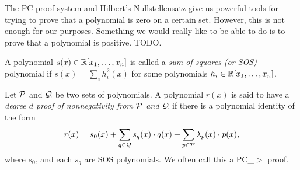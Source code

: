 The PC proof system and Hilbert's Nullstellensatz give us powerful tools for trying to prove that a polynomial is zero on a certain set. However, this is not enough for our purposes. Something we would really like to be able to do is to prove that a polynomial is positive. TODO.
\begin{definition}
A polynomial $s(x) \in \mathbb R[x_1,\dots,x_n]$ is called a \emph{sum-of-squares (or SOS)} polynomial if $s(x) = \sum_i h_i^2(x)$ for some polynomials $h_i \in \mathbb R[x_1,\dots,x_n]$.
\end{definition}
\begin{definition}
Let $\mathcal P$ and $\mathcal Q$ be two sets of polynomials. A polynomial $r(x)$ is said to have a \emph{degree $d$ proof of nonnegativity from $\mathcal P$ and $\mathcal Q$} if there is a polynomial identity of the form
\[r(x) = s_0(x) + \sum_{q \in \mathcal Q} s_q(x) \cdot q(x) + \sum_{p \in \mathcal P} \lambda_p(x) \cdot p(x),\]
where $s_0$, and each $s_q$ are SOS polynomials. We often call this a PC_$>$ proof. 
\end{definition}